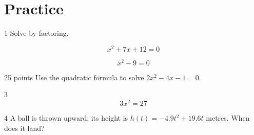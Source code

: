 \documentclass[11pt]{article}
\title{#1}\author{#2}\date{}%
\begin{document}

\section*{Practice}

\begin{clkeep}
\begin{clproblem}{1}{}
Solve by factoring.

\begin{clparts}
\item
\[
x^{2} + 7x + 12 = 0
\]
\item
\[
x^{2} - 9 = 0
\]
\end{clparts}
\end{clproblem}
\end{clkeep}

\begin{clkeep}
\begin{clproblem}{2}{5 points}
Use the quadratic formula to solve \(2x^{2} - 4x - 1 = 0\).

\end{clproblem}
\end{clkeep}

\begin{clkeep}
\begin{clproblem}{3}{}
\[
3x^{2} = 27
\]
\end{clproblem}
\end{clkeep}

\begin{clkeep}
\begin{clproblem}{4}{}
A ball is thrown upward; its height is \(h(t) = -4.9t^{2} + 19.6t\) metres. When does it land?

\end{clproblem}
\end{clkeep}
\end{document}
